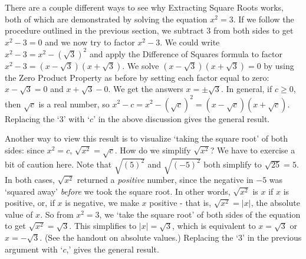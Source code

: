 \documentclass[11pt]{article}
\theoremstyle{definition}  %
\begin{document}
\medskip

There are a couple different ways to see why Extracting Square Roots works, both of which are demonstrated by solving the equation $x^2 = 3$.  If we follow the procedure outlined in the previous section, we subtract $3$ from both sides to get $x^2 - 3 = 0$ and we now try to factor $x^2 - 3$.   We could write $x^2 - 3 = x^2 - (\sqrt{3})^2$ and apply the Difference of Squares formula to factor $x^2 - 3 = (x-\sqrt{3})(x+\sqrt{3})$.  We solve $(x-\sqrt{3})(x+\sqrt{3}) = 0$ by using the Zero Product Property as before by setting each factor equal to zero:  $x - \sqrt{3} = 0$ and $x+\sqrt{3} - 0$.  We get the answers $x = \pm \sqrt{3}$.  In general,  if $c \geq 0$, then $\sqrt{c}$ is a real number, so  $x^2 - c = x^2 - (\sqrt{c})^2 = (x-\sqrt{c})(x+\sqrt{c})$.  Replacing the `$3$' with `$c$' in the above discussion gives the general result. 

\smallskip

Another way to view this result is to visualize  `taking the square root' of both sides:   since $x^2 = c$,  $\sqrt{x^2} = \sqrt{c}$.  How do we simplify $\sqrt{x^2}$? We have to exercise a bit of caution here.  Note that $\sqrt{(5)^2}$ and $\sqrt{(-5)^2}$ both simplify to  $\sqrt{25} = 5$.  In both cases, $\sqrt{x^2}$ returned a \textit{positive} number, since the negative in $-5$ was `squared away' \textit{before} we took the square root.  In other words, $\sqrt{x^2}$ is $x$ if $x$ is positive, or, if $x$ is negative, we make $x$ positive - that is, $\sqrt{x^2} = |x|$, the absolute value of $x$.  So from $x^2 = 3$, we `take the square root' of both sides of the equation to get $\sqrt{x^2} = \sqrt{3}$.  This simplifies to $|x| = \sqrt{3}$, which is equivalent to $x = \sqrt{3}$ or $x = -\sqrt{3}$.  (See the handout on absolute values.) Replacing the `$3$' in the previous argument with `$c$,' gives the general result.

\smallskip
\end{document}

